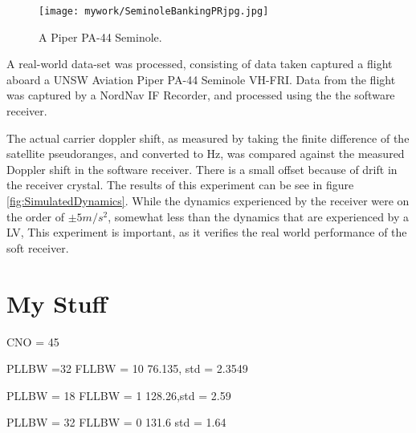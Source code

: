 \begin{figure}[!htb] 
    \centering
    \texttt{[image: mywork/SeminoleBankingPRjpg.jpg]} 
    \caption{A Piper PA-44 Seminole.}
    \label{fig:PiperSeminole}
\end{figure}

A real-world data-set was processed, consisting of data taken captured a flight aboard a UNSW Aviation Piper PA-44 Seminole VH-FRI. Data from the flight was captured by a NordNav IF Recorder, and processed using the the software receiver. 

The actual carrier doppler shift, as measured by taking the finite difference of the satellite pseudoranges, and converted to Hz, was compared against the measured Doppler shift in the software receiver. There is a small offset because of drift in the receiver crystal. The results of this experiment can be see in figure \ref{fig:SimulatedDynamics}. While the dynamics experienced by the receiver were on the order of $\pm 5m/s^2$, somewhat less than the dynamics that are experienced by a \ac{LV}, This experiment is important, as it verifies the real world performance of the soft receiver. 



\section{My Stuff}

CNO = 45

PLLBW =32
FLLBW = 10
76.135, std = 2.3549

PLLBW = 18
FLLBW = 1
128.26,std =  2.59 

PLLBW = 32
FLLBW = 0
131.6 std = 1.64


